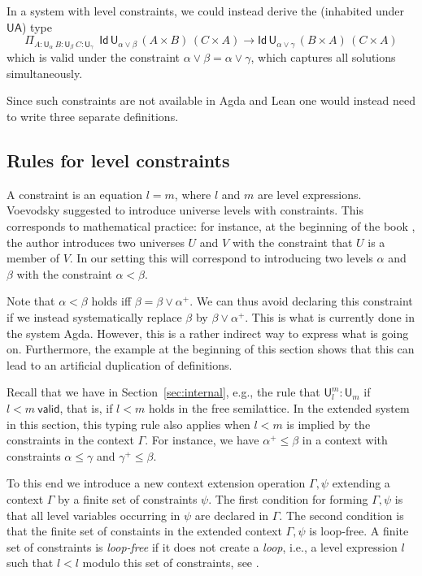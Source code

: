 \documentclass[11pt,a4paper]{article}
\theoremstyle{definition}
\newcommand{\Id}{\mathsf{Id}}
\newcommand{\UU}{\mathsf{U}}
\newcommand{\valid}{\mathsf{valid}}
\newcommand{\UA}{\mathsf{UA}}
\begin{document}
In a system with level constraints, 
we could instead derive the (inhabited under $\UA$) type
$$
    \Pi_{A:\UU_\alpha~{B}:{\UU_\beta}~{C}:{\UU_\gamma}}
    {~~\Id\,\UU_{\alpha \vee \beta}\, (A\times B)\,(C \times A)
    \to \Id\,\UU_{\alpha \vee \gamma}\, (B\times A)\,(C \times A)}
$$
which is valid under the constraint
$\alpha \vee \beta = \alpha \vee \gamma$,
which captures all solutions simultaneously. 

Since such constraints are not available in Agda and Lean
one would instead need to write three separate definitions.

\subsection*{Rules for level constraints}%

A constraint is an equation $l = m$, where $l$ and $m$ are level expressions.
Voevodsky \cite{VV} suggested to introduce universe levels with
constraints. This corresponds to mathematical practice: 
for instance, at the beginning of the book \cite{giraud:cohom-non-abel},
the author introduces two universes $U$ and $V$ with the constraint 
that $U$ is a member of $V$.
In our setting this will correspond to introducing two levels 
$\alpha$ and $\beta$ with the constraint $\alpha<\beta$.

Note that $\alpha < \beta$ holds iff $\beta = \beta \vee\alpha^+$. 
We can thus avoid declaring this constraint if we instead 
systematically replace $\beta$ by $\beta\vee\alpha^+$.
This is what is currently done in the system Agda. 
However, this is a rather indirect way to express what is
going on. Furthermore, the example at the beginning of this section 
shows that this can lead to an artificial duplication of definitions.

Recall that we have in Section~\ref{sec:internal}, e.g., the rule
that $\UU^m_l:\UU_m$ if $l<m~\valid$, that is, if 
$l<m$ holds in the free semilattice. %
In the extended system in this section, this typing rule also applies 
when $l<m$ is implied by the constraints in the context $\Gamma$.
For instance, we have $\alpha^+\leqslant\beta$ in a context 
with constraints $\alpha\leqslant\gamma$ and $\gamma^+\leqslant\beta$.

To this end we introduce a new context extension operation $\Gamma,\psi$
extending a context $\Gamma$ by a finite set of constraints $\psi$. 
The first condition for forming $\Gamma,\psi$ is that all level variables
occurring in $\psi$ are declared in $\Gamma$. The second condition
is that the finite set of constaints in the extended context 
$\Gamma,\psi$ is loop-free. 
A finite set of constraints is {\em loop-free} if it does not 
create a {\em loop}, i.e., a level expression $l$ such that $l<l$ 
modulo this set of constraints, see \cite{bezem-coquand:lattices}.
\end{document}
